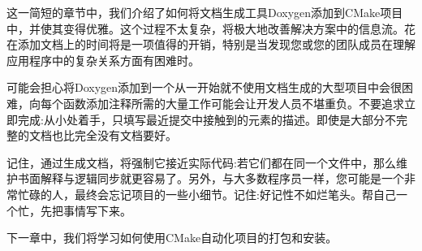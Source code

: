 
这一简短的章节中，我们介绍了如何将文档生成工具Doxygen添加到CMake项目中，并使其变得优雅。这个过程不太复杂，将极大地改善解决方案中的信息流。花在添加文档上的时间将是一项值得的开销，特别是当发现您或您的团队成员在理解应用程序中的复杂关系方面有困难时。

可能会担心将Doxygen添加到一个从一开始就不使用文档生成的大型项目中会很困难，向每个函数添加注释所需的大量工作可能会让开发人员不堪重负。不要追求立即完成:从小处着手，只填写最近提交中接触到的元素的描述。即使是大部分不完整的文档也比完全没有文档要好。

记住，通过生成文档，将强制它接近实际代码:若它们都在同一个文件中，那么维护书面解释与逻辑同步就更容易了。另外，与大多数程序员一样，您可能是一个非常忙碌的人，最终会忘记项目的一些小细节。记住:好记性不如烂笔头。帮自己一个忙，先把事情写下来。

下一章中，我们将学习如何使用CMake自动化项目的打包和安装。



